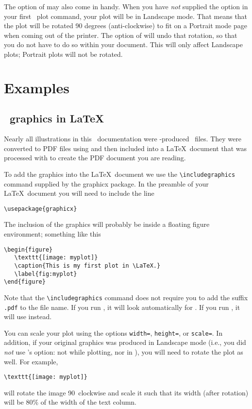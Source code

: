 The  option of  may also come in handy. When you have \emph{not} supplied the  option in your first \GMT\ plot command, your plot will be in Landscape mode. That means that the plot will be rotated 90 degrees (anti-clockwise) to fit on a Portrait mode page when coming out of the printer. The  option of  will undo that rotation, so that you do not have to do so within your document. This will only affect Landscape plots; Portrait plots will not be rotated.

\section{Examples}
\subsection{\gmt\ graphics in \LaTeX}

Nearly all illustrations in this \GMT\ documentation were \GMT-produced \PS\ files. They were converted to PDF files using  and then included into a \LaTeX\ document that was processed with  to create the PDF document you are reading.

To add the graphics into the \LaTeX\ document we use the \verb|\includegraphics| command supplied by the \textsf{graphicx} package. In the preamble of your \LaTeX\ document you will need to include the line
\small
\begin{verbatim}
\usepackage{graphicx}
\end{verbatim}
\normalsize
The inclusion of the graphics will probably be inside a floating figure environment; something like this
\small
\begin{verbatim}
\begin{figure}
   \texttt{[image: myplot]}
   \caption{This is my first plot in \LaTeX.}
   \label{fig:myplot}
\end{figure}
\end{verbatim}
\normalsize
Note that the \verb|\includegraphics| command does not require you to add the suffix \verb|.pdf| to the file name. If you run , it will look automatically for . If you run , it will use  instead.

You can scale your plot using the options \verb|width=|, \verb|height=|, or \verb|scale=|. In addition, if your original graphics was produced in Landscape mode (i.e., you did \emph{not} use \GMT's  option: not while plotting, nor in ), you will need to rotate the plot as well. For example,
\small
\begin{verbatim}
\texttt{[image: myplot]}
\end{verbatim}
\normalsize
will rotate the image 90\DS\ clockwise and scale it such that its width (after rotation) will be 80\% of the width of the text column.


